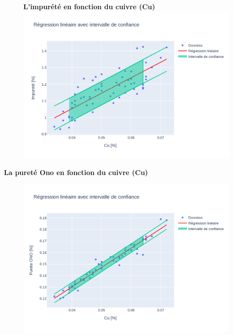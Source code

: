 \documentclass[12pt]{article}
\begin{document}
\begin{figure}[H]
\textbf{L'impurété en fonction du cuivre (Cu)} 
\includegraphics[width=\textwidth]{Images/Statistique/Regression_Impurete_Cu.pdf} 
\end{figure}




\textbf{La pureté Ono en fonction du cuivre (Cu)} 
\begin{figure}[H]
\includegraphics[width=\textwidth]{Images/Statistique/Regression_Ono_Cu.pdf} 
\end{figure}
\end{document}
